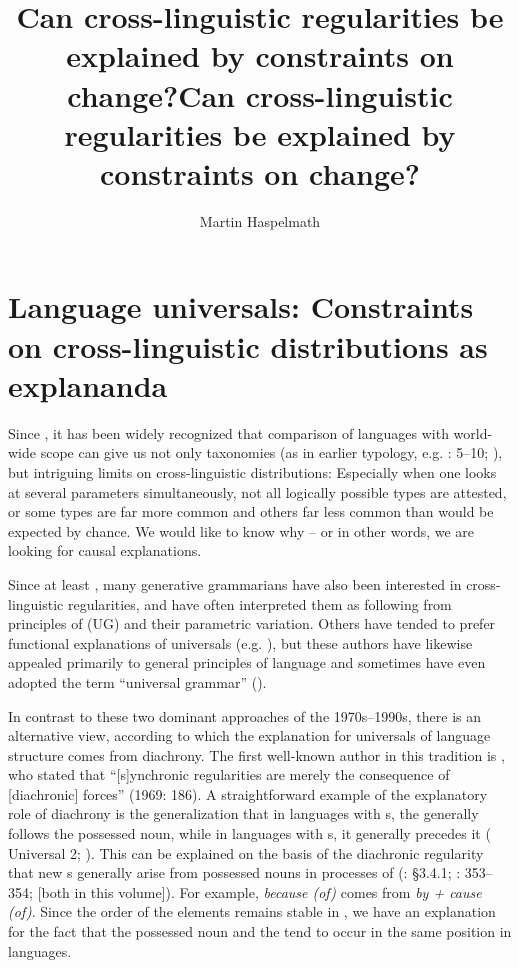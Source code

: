 \documentclass[output=paper]{langsci/langscibook}
\author{Martin Haspelmath\affiliation{MPI-SHH Jena \& Leipzig University}}
\title{Can cross-linguistic regularities be explained by constraints on change?}
\begin{document}
\maketitle 

\title{{Can cross-linguistic} regularities be explained by constraints on change?}

 
 

\section{Language universals: Constraints on cross-linguistic distributions as explananda}\label{sec:haspelmath:1}

Since \citet{Greenberg1963}, it has been widely recognized that comparison of languages with world-wide scope can give us not only taxonomies (as in earlier typology, e.g. \citealt{Schlegel1808,Schleicher1850}: 5–10; \citealt{Sapir1921}), but intriguing limits on cross-linguistic distributions: Especially when one looks at several parameters simultaneously, not all logically possible types are attested, or some types are far more common and others far less common than would be expected by chance. We would like to know why – or in other words, we are looking for causal explanations.

Since at least \citet{Chomsky1981}, many generative grammarians have also been interested in cross-linguistic regularities, and have often interpreted them as following from  principles of  (UG) and their parametric variation. Others have tended to prefer functional explanations of universals (e.g. \citealt{Comrie1989,Stassen1985,Dixon1994,Dik1997,Hawkins2014_VarEff}), but these authors have likewise appealed primarily to general principles of language and sometimes have even adopted the term “universal grammar” (\citealt{KeenanComrie1977,FoleyVanValin1984,Stassen1985}).

In contrast to these two dominant approaches of the 1970s–1990s, there is an alternative view, according to which the explanation for universals of language structure comes from diachrony. The first well-known author in this tradition is \citet{Greenberg1969}, who stated that “[s]ynchronic regularities are merely the consequence of [diachronic] forces” (1969: 186). A straightforward example of the explanatory role of diachrony is the generalization that in languages with s, the  generally follows the possessed noun, while in languages with s, it generally precedes it ( Universal 2; \citealt{Dryer1992}). This can be explained on the basis of the diachronic regularity that new s generally arise from possessed nouns in processes of  (\citealt{Lehmann1982_Thoughts}: §3.4.1; \citealt{Bybee1988}: 353–354; \citealt{chapters/collins,chapters/dryer} [both in  this volume]). For example,  \textit{because (of)} comes from \textit{by + cause (of)}. Since the order of the elements remains stable in , we have an explanation for the fact that the possessed noun and the  tend to occur in the same position in languages.
\end{document}
